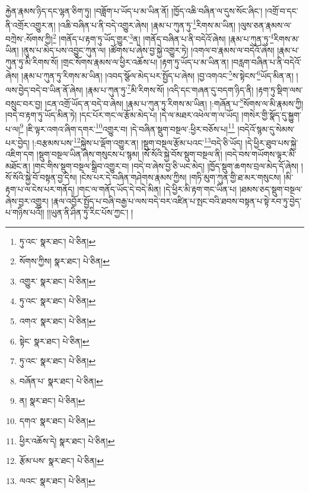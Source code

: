 རྐྱེན་རྣམས་ཉིད་དང་ལྷན་ཅིག་ཏུ། །བཟློག་པ་ཡོད་པ་མ་ཡིན་ནོ། །ཁྱོད་འཆི་བཞིན་ལ་དུས་སོང་ཞིང་། །འགྲོ་བ་དང་ནི་འགྲོར་འགྱུར་ན། །འཆི་བཞིན་པ་ནི་བདེ་འགྱུར་ཞེས། །རྣམ་པ་ཀུན་ཏུ་\footnote{ཏུ་འང་  སྣར་ཐང་།  པེ་ཅིན། }རིགས་མ་ཡིན། །ལུས་ཅན་རྣམས་ལ་བཀྲེས་:སོགས་ཀྱི།\footnote{སོགས་ཀྱིས།  སྣར་ཐང་།  པེ་ཅིན། } །གནོད་པ་རྟག་ཏུ་ཡོད་གྱུར་\footnote{འགྱུར་  སྣར་ཐང་།  པེ་ཅིན། }ན། །གནོད་བཞིན་པ་ནི་བདེའོ་ཞེས། །རྣམ་པ་ཀུན་ཏུ་\footnote{ཏུ་འང་  སྣར་ཐང་།  པེ་ཅིན། }རིགས་མ་ཡིན། །ནུས་པ་མེད་པས་འབྱུང་ཀུན་ལ། །ཚོགས་པ་ཞེས་བྱ་སྐྱེ་འགྱུར་ཏེ། །འགལ་བ་རྣམས་ལ་བདེའོ་ཞེས། །རྣམ་པ་ཀུན་ཏུ་མི་རིགས་སོ། །གྲང་སོགས་རྣམས་ལ་ཕྱིར་འཆོས་པ། །རྟག་ཏུ་ཡོད་པ་མ་ཡིན་ན། །བརླག་བཞིན་པ་ནི་བདེའོ་ཞེས། །རྣམ་པ་ཀུན་ཏུ་རིགས་མ་ཡིན། །འབད་སྩོལ་མེད་པར་སྤྱོད་པ་ཞེས། །བྱ་འགའང་\footnote{འགའ་  སྣར་ཐང་།  པེ་ཅིན། }ས་སྟེངས་\footnote{སྟེང་  སྣར་ཐང་།  པེ་ཅིན། }ཡོད་མིན་ན། །ལས་བྱེད་བདེ་བ་ཡིན་ནོ་ཞེས། །རྣམ་པ་ཀུན་ཏུ་\footnote{ཏུ་འང་  སྣར་ཐང་།  པེ་ཅིན། }མི་རིགས་སོ། །འདི་དང་གཞན་དུ་བདག་ཉིད་ནི། །རྟག་ཏུ་སྡིག་ལས་བསྲུང་བར་བྱ། །ངན་འགྲོ་ཡོད་ན་བདེ་བ་ཞེས། །རྣམ་པ་ཀུན་ཏུ་རིགས་མ་ཡིན། །:གཞོན་པ་\footnote{བཞོན་པ་  སྣར་ཐང་།  པེ་ཅིན། }སོགས་ལ་མི་རྣམས་ཀྱི། །བདེ་བ་རྟག་ཏུ་ཡོད་མིན་ཏེ། །དང་པོར་གང་ལ་རྩོམ་མེད་པ། །དེ་ལ་མཐར་འཕེལ་ག་ལ་ཡོད། །གསེར་གྱི་སྣོད་དུ་སྐྱུག་པ་ལ།\footnote{ན།  སྣར་ཐང་།  པེ་ཅིན། } །ཇི་ལྟར་འགའ་ཞིག་དགར་\footnote{དགའ་  སྣར་ཐང་།  པེ་ཅིན། }འགྱུར་བ། །དེ་བཞིན་སྡུག་བསྔལ་:ཕྱིར་བཅོས་པ།\footnote{ཕྱིར་འཆོས་དེ།  སྣར་ཐང་།  པེ་ཅིན། } །བདེའོ་སྙམ་དུ་སེམས་པར་བྱེད། །:བརྩམས་པས་\footnote{རྩོམ་པས་  སྣར་ཐང་།  པེ་ཅིན། }སྐྱེས་པ་ལྡོག་འགྱུར་ན། །སྡུག་བསྔལ་རྩོམ་པའང་\footnote{ལའང་  སྣར་ཐང་།  པེ་ཅིན། }བདེ་ཅི་ཡོད། །དེ་ཕྱིར་ཐུབ་པས་སྐྱེ་འཇིག་དག །སྡུག་བསྔལ་ཡིན་ཞེས་གསུངས་པ་སྙམ། །སོ་སོའི་སྐྱེ་བོས་སྡུག་བསྔལ་ནི། །བདེ་བས་གཡོགས་ལྟར་མི་མཐོང་ན། །གང་གིས་སྡུག་བསྔལ་སྒྲིབ་འགྱུར་བ། །བདེ་བ་ཞེས་བྱ་ཅི་ཡང་མེད། །ཁྱོད་སྡུག་ཆགས་བྲལ་མེད་དོ་ཞེས། །སོ་སོའི་སྐྱེ་བོ་བསྟན་བྱ་དེས། །ངེས་པར་དེ་བཞིན་གཤེགས་རྣམས་ཀྱིས། །གཏི་མུག་ཀུན་གྱི་ཐ་མར་གསུངས། །མི་རྟག་པ་ལ་ངེས་པར་གནོད། །གང་ལ་གནོད་ཡོད་དེ་བདེ་མིན། །དེ་ཕྱིར་མི་རྟག་གང་ཡིན་པ། །ཐམས་ཅད་སྡུག་བསྔལ་ཞེས་བྱར་འགྱུར། །རྣལ་འབྱོར་སྤྱོད་པ་བཞི་བརྒྱ་པ་ལས་བདེ་བར་འཛིན་པ་སྤང་བའི་ཐབས་བསྟན་པ་སྟེ་རབ་ཏུ་བྱེད་པ་གཉིས་པའོ།། །།ཡུན་ནི་ཤིན་ཏུ་རིང་པོས་ཀྱང་། །
